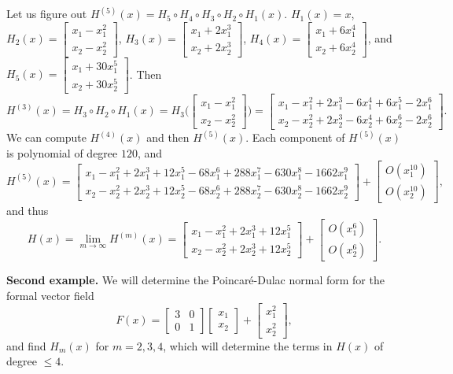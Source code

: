 \documentclass{article}
\theoremstyle{definition}
\begin{document}
Let us figure out $H^{(5)}(x)=H_5\circ H_4 \circ H_3 \circ H_2 \circ H_1 (x)$. $H_1(x)=x$,
$H_2(x)=\begin{bmatrix}x_1-x_1^2\\x_2-x_2^2\end{bmatrix}$,
$H_3(x)=\begin{bmatrix}x_1+2x_1^3\\x_2+2x_2^3\end{bmatrix}$,
$H_4(x)=
\begin{bmatrix}x_1+6x_1^4\\x_2+6x_2^4\end{bmatrix}$,
and $H_5(x)=\begin{bmatrix}x_1+30x_1^5\\x_2+30x_2^5\end{bmatrix}$.
Then
\[
H^{(3)}(x)=H_3 \circ H_2 \circ H_1(x)=H_3\Big(\begin{bmatrix}x_1-x_1^2\\x_2-x_2^2\end{bmatrix}\Big)=
\begin{bmatrix}
x_1-x_1^2+2x_1^3-6x_1^4+6x_1^5-2x_1^6\\
x_2-x_2^2+2x_2^3-6x_2^4+6x_2^6-2x_2^6
\end{bmatrix}.
\]
We can compute $H^{(4)}(x)$ and then $H^{(5)}(x)$. Each component of $H^{(5)}(x)$ is polynomial
of degree $120$, and
\[
H^{(5)}(x)=\begin{bmatrix}
x_1 - x_1^2 + 2 x_1^3 + 12 x_1^5 - 68 x_1^6 + 288 x_1^7 - 630 x_1^8 - 1662 x_1^9\\
x_2 - x_2^2 + 2 x_2^3 + 12 x_2^5 - 68 x_2^6 + 288 x_2^7 - 630 x_2^8 - 1662 x_2^9
\end{bmatrix}
+
\begin{bmatrix}
O(x_1^{10})\\
O(x_2^{10})
\end{bmatrix},
\]
and thus
\[
H(x)=\lim_{m \to \infty} H^{(m)}(x)=
\begin{bmatrix}
x_1 - x_1^2 + 2 x_1^3 + 12 x_1^5\\
x_2 - x_2^2 + 2 x_2^3 + 12 x_2^5
\end{bmatrix}
+
\begin{bmatrix}
O(x_1^6)\\
O(x_2^6)
\end{bmatrix}.
\]

\textbf{Second example.} We will determine the Poincar\'e-Dulac normal form for the formal vector field
\[
F(x)=\begin{bmatrix}3&0\\0&1\end{bmatrix}\begin{bmatrix}x_1\\x_2\end{bmatrix}+\begin{bmatrix}x_1^2\\x_2^2\end{bmatrix},
\]
and find $H_m(x)$ for $m=2,3,4$, which will determine the terms in $H(x)$ of degree $\leq 4$.
\end{document}
